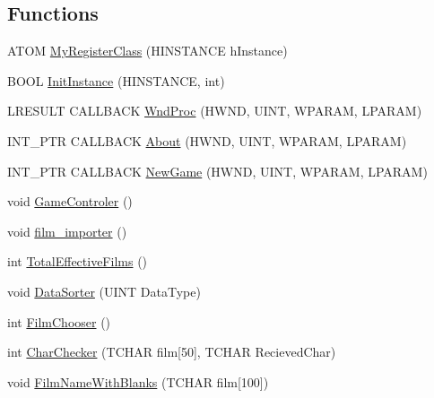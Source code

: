 \subsection*{Functions}
\begin{DoxyCompactItemize}
\item 
A\+T\+O\+M \hyperlink{_b_o_w-a_01film_01guessing_01game_8cpp_aa0d0c9beb94350f8eac8fc4026a65375}{My\+Register\+Class} (H\+I\+N\+S\+T\+A\+N\+C\+E h\+Instance)
\item 
B\+O\+O\+L \hyperlink{_b_o_w-a_01film_01guessing_01game_8cpp_a5f77d4e3e5569ff9d236463fd80ebe28}{Init\+Instance} (H\+I\+N\+S\+T\+A\+N\+C\+E, int)
\item 
L\+R\+E\+S\+U\+L\+T C\+A\+L\+L\+B\+A\+C\+K \hyperlink{_b_o_w-a_01film_01guessing_01game_8cpp_a9135ea2a0d6fce68ba3b858226a31a4f}{Wnd\+Proc} (H\+W\+N\+D, U\+I\+N\+T, W\+P\+A\+R\+A\+M, L\+P\+A\+R\+A\+M)
\item 
I\+N\+T\+\_\+\+P\+T\+R C\+A\+L\+L\+B\+A\+C\+K \hyperlink{_b_o_w-a_01film_01guessing_01game_8cpp_a5873af2ee357a48c39cdd824f51c1c9c}{About} (H\+W\+N\+D, U\+I\+N\+T, W\+P\+A\+R\+A\+M, L\+P\+A\+R\+A\+M)
\item 
I\+N\+T\+\_\+\+P\+T\+R C\+A\+L\+L\+B\+A\+C\+K \hyperlink{_b_o_w-a_01film_01guessing_01game_8cpp_a09671f5a4fceb7869c61603ea361260f}{New\+Game} (H\+W\+N\+D, U\+I\+N\+T, W\+P\+A\+R\+A\+M, L\+P\+A\+R\+A\+M)
\item 
void \hyperlink{_b_o_w-a_01film_01guessing_01game_8cpp_a6b823f257026b7014379a568a9ee0674}{Game\+Controler} ()
\item 
void \hyperlink{_b_o_w-a_01film_01guessing_01game_8cpp_a6663fba813a44adbada0c8b08eb8c328}{film\+\_\+importer} ()
\item 
int \hyperlink{_b_o_w-a_01film_01guessing_01game_8cpp_a1580b4205b99ef1d084d5592befc9b81}{Total\+Effective\+Films} ()
\item 
void \hyperlink{_b_o_w-a_01film_01guessing_01game_8cpp_a844b65907b85d1b68843603a3d530f46}{Data\+Sorter} (U\+I\+N\+T Data\+Type)
\item 
int \hyperlink{_b_o_w-a_01film_01guessing_01game_8cpp_a9c28ab6d188de541ba834a20c87f5cf3}{Film\+Chooser} ()
\item 
int \hyperlink{_b_o_w-a_01film_01guessing_01game_8cpp_a8c4bb564466cca1f3a5ca7e98426d408}{Char\+Checker} (T\+C\+H\+A\+R film\mbox{[}50\mbox{]}, T\+C\+H\+A\+R Recieved\+Char)
\item 
void \hyperlink{_b_o_w-a_01film_01guessing_01game_8cpp_a1d54062b70b08f8a9d208a3a4a81917a}{Film\+Name\+With\+Blanks} (T\+C\+H\+A\+R film\mbox{[}100\mbox{]})

\end{DoxyCompactItemize}
